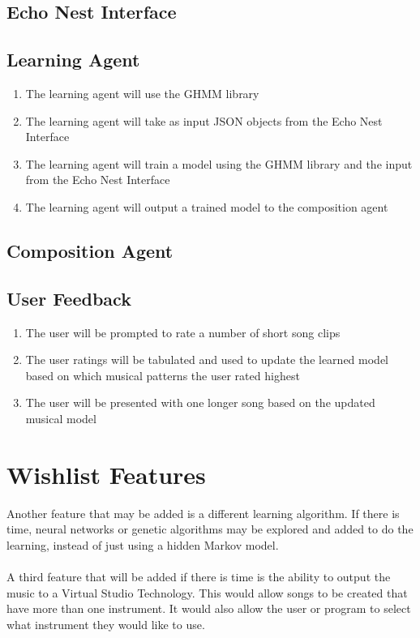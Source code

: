 \documentclass{article}
\begin{document}
\subsection{Echo Nest Interface}


\subsection{Learning Agent}
\begin{enumerate}
\item The learning agent will use the GHMM library
\item The learning agent will take as input JSON objects from the Echo Nest Interface
\item The learning agent will train a model \cite{GHMM} using the GHMM library and the input from the Echo Nest Interface
\item The learning agent will output a trained model to the composition agent
\end{enumerate}

\subsection{Composition Agent}


\subsection{User Feedback}
\begin{enumerate}
\item The user will be prompted to rate a number of short song clips
\item The user ratings will be tabulated and used to update the learned model based on which musical patterns the user rated highest
\item The user will be presented with one longer song based on the updated musical model
\end{enumerate}

\section{Wishlist Features}
Another feature that may be added is a different learning algorithm. If there is time, neural networks or genetic algorithms may be explored and added to do the learning, instead of just using a hidden Markov model.\\
\\
A third feature that will be added if there is time is the ability to output the music to a Virtual Studio Technology. This would allow songs to be created that have more than one instrument. It would also allow the user or program to select what instrument they would like to use.
\end{document}
